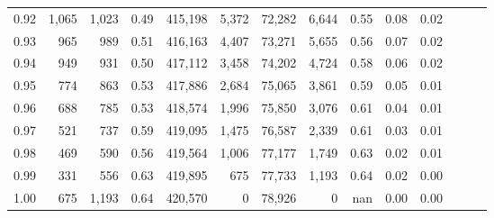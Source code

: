 \begin{tabular}{rrrrrrrrrrrrrr}
0.92 &  1,065 &  1,023 &  0.49 &  415,198 &    5,372 &  72,282 &   6,644 &  0.55 &  0.08 &      0.02 \\
0.93 &    965 &    989 &  0.51 &  416,163 &    4,407 &  73,271 &   5,655 &  0.56 &  0.07 &      0.02 \\
0.94 &    949 &    931 &  0.50 &  417,112 &    3,458 &  74,202 &   4,724 &  0.58 &  0.06 &      0.02 \\
0.95 &    774 &    863 &  0.53 &  417,886 &    2,684 &  75,065 &   3,861 &  0.59 &  0.05 &      0.01 \\
0.96 &    688 &    785 &  0.53 &  418,574 &    1,996 &  75,850 &   3,076 &  0.61 &  0.04 &      0.01 \\
0.97 &    521 &    737 &  0.59 &  419,095 &    1,475 &  76,587 &   2,339 &  0.61 &  0.03 &      0.01 \\
0.98 &    469 &    590 &  0.56 &  419,564 &    1,006 &  77,177 &   1,749 &  0.63 &  0.02 &      0.01 \\
0.99 &    331 &    556 &  0.63 &  419,895 &      675 &  77,733 &   1,193 &  0.64 &  0.02 &      0.00 \\
1.00 &    675 &  1,193 &  0.64 &  420,570 &        0 &  78,926 &       0 &   nan &  0.00 &      0.00 \\
\bottomrule
\end{tabular}
